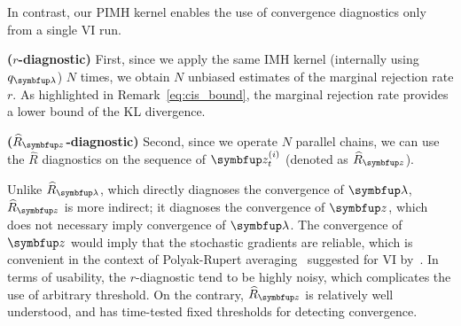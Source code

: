 In contrast, our PIMH kernel enables the use of convergence diagnostics only from a single VI run.
\begin{enumerate*}[label=\textbf{(\roman*)}]
  \item \textbf{(\(r\)-diagnostic)} First, since we apply the same IMH kernel (internally using \(q_{\vlambda}\)) \(N\) times, we obtain \(N\) unbiased estimates of the marginal rejection rate \(r\).
    As highlighted in Remark~\eqref{eq:cis_bound}, the marginal rejection rate provides a lower bound of the KL divergence.
  \item \textbf{(\(\widehat{R}_{\vz}\)-diagnostic)} Second, since we operate \(N\) parallel chains, we can use the \(\widehat{R}\) diagnostics on the sequence of \(\vz_t^{(i)}\) (denoted as \(\widehat{R}_{\vz}\)).
\end{enumerate*}
Unlike \(\widehat{R}_{\vlambda}\), which directly diagnoses the convergence of \(\vlambda\), \(\widehat{R}_{\vz}\) is more indirect; it diagnoses the convergence of \(\vz\), which does not necessary imply convergence of \(\vlambda\).
The convergence of \(\vz\) would imply that the stochastic gradients are reliable, which is convenient in the context of Polyak-Rupert averaging~\citep{ruppert_efficient_1988, polyak_acceleration_1992} suggested for VI by~\citet{NEURIPS2020_7cac11e2}.
In terms of usability, the \(r\)-diagnostic tend to be highly noisy, which complicates the use of arbitrary threshold.
On the contrary, \(\widehat{R}_{\vz}\) is relatively well understood, and has time-tested fixed thresholds for detecting convergence.


